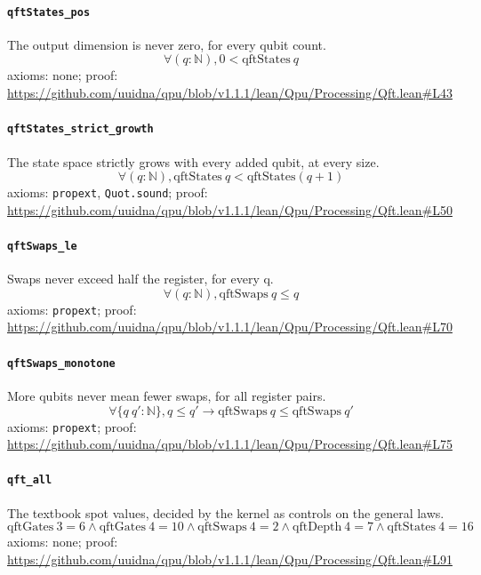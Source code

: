 \documentclass[11pt]{article}
\begin{document}
\paragraph{\texttt{qftStates\_pos}}
The output dimension is never zero, for every qubit count.
\[ \forall (q : \mathbb{N}), 0 < \mathrm{qftStates}\ q \]
\noindent axioms: none; proof: \url{https://github.com/uuidna/qpu/blob/v1.1.1/lean/Qpu/Processing/Qft.lean\#L43}

\paragraph{\texttt{qftStates\_strict\_growth}}
The state space strictly grows with every added qubit, at every size.
\[ \forall (q : \mathbb{N}), \mathrm{qftStates}\ q < \mathrm{qftStates} (q + 1) \]
\noindent axioms: \texttt{propext}, \texttt{Quot.sound}; proof: \url{https://github.com/uuidna/qpu/blob/v1.1.1/lean/Qpu/Processing/Qft.lean\#L50}

\paragraph{\texttt{qftSwaps\_le}}
Swaps never exceed half the register, for every q.
\[ \forall (q : \mathbb{N}), \mathrm{qftSwaps}\ q \le q \]
\noindent axioms: \texttt{propext}; proof: \url{https://github.com/uuidna/qpu/blob/v1.1.1/lean/Qpu/Processing/Qft.lean\#L70}

\paragraph{\texttt{qftSwaps\_monotone}}
More qubits never mean fewer swaps, for all register pairs.
\[ \forall \{q\ q' : \mathbb{N}\}, q \le q' \to \mathrm{qftSwaps}\ q \le \mathrm{qftSwaps}\ q' \]
\noindent axioms: \texttt{propext}; proof: \url{https://github.com/uuidna/qpu/blob/v1.1.1/lean/Qpu/Processing/Qft.lean\#L75}

\paragraph{\texttt{qft\_all}}
The textbook spot values, decided by the kernel as controls on the general laws.
\[ \mathrm{qftGates}\ 3 = 6 \land \mathrm{qftGates}\ 4 = 10 \land \mathrm{qftSwaps}\ 4 = 2 \land \mathrm{qftDepth}\ 4 = 7 \land \mathrm{qftStates}\ 4 = 16 \]
\noindent axioms: none; proof: \url{https://github.com/uuidna/qpu/blob/v1.1.1/lean/Qpu/Processing/Qft.lean\#L91}
\end{document}
